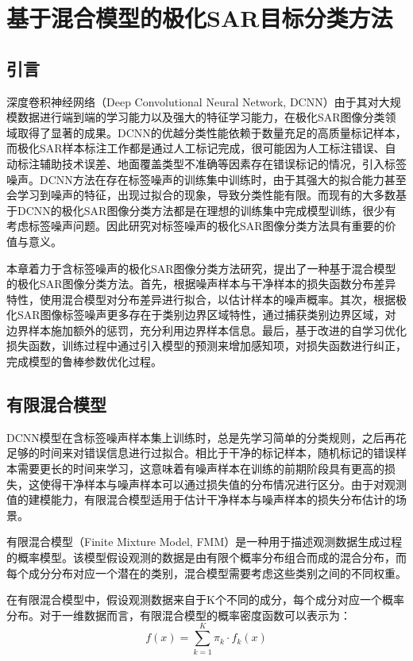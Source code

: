 \chapter{基于混合模型的极化SAR目标分类方法}
\section{引言}
深度卷积神经网络（Deep Convolutional Neural Network, DCNN）由于其对大规模数据进行端到端的学习能力以及强大的特征学习能力，在极化SAR图像分类领域取得了显著的成果。DCNN的优越分类性能依赖于数量充足的高质量标记样本，而极化SAR样本标注工作都是通过人工标记完成，很可能因为人工标注错误、自动标注辅助技术误差、地面覆盖类型不准确等因素存在错误标记的情况，引入标签噪声。DCNN方法在存在标签噪声的训练集中训练时，由于其强大的拟合能力甚至会学习到噪声的特征，出现过拟合的现象，导致分类性能有限。而现有的大多数基于DCNN的极化SAR图像分类方法都是在理想的训练集中完成模型训练，很少有考虑标签噪声问题。因此研究对标签噪声的极化SAR图像分类方法具有重要的价值与意义。

本章着力于含标签噪声的极化SAR图像分类方法研究，提出了一种基于混合模型的极化SAR图像分类方法。首先，根据噪声样本与干净样本的损失函数分布差异特性，使用混合模型对分布差异进行拟合，以估计样本的噪声概率。其次，根据极化SAR图像标签噪声更多存在于类别边界区域特性，通过捕获类别边界区域，对边界样本施加额外的惩罚，充分利用边界样本信息。最后，基于改进的自学习优化损失函数，训练过程中通过引入模型的预测来增加感知项，对损失函数进行纠正，完成模型的鲁棒参数优化过程。

\section{有限混合模型}
DCNN模型在含标签噪声样本集上训练时，总是先学习简单的分类规则，之后再花足够的时间来对错误信息进行过拟合。相比于干净的标记样本，随机标记的错误样本需要更长的时间来学习，这意味着有噪声样本在训练的前期阶段具有更高的损失，这使得干净样本与噪声样本可以通过损失值的分布情况进行区分。由于对观测值的建模能力，有限混合模型适用于估计干净样本与噪声样本的损失分布估计的场景。

有限混合模型（Finite Mixture Model, FMM）是一种用于描述观测数据生成过程的概率模型。该模型假设观测的数据是由有限个概率分布组合而成的混合分布，而每个成分分布对应一个潜在的类别，混合模型需要考虑这些类别之间的不同权重。

在有限混合模型中，假设观测数据来自于K个不同的成分，每个成分对应一个概率分布。对于一维数据而言，有限混合模型的概率密度函数可以表示为：
\begin{equation}
    f(x)=\sum_{k=1}^{K}\pi_k \cdot f_k(x)
\end{equation}

